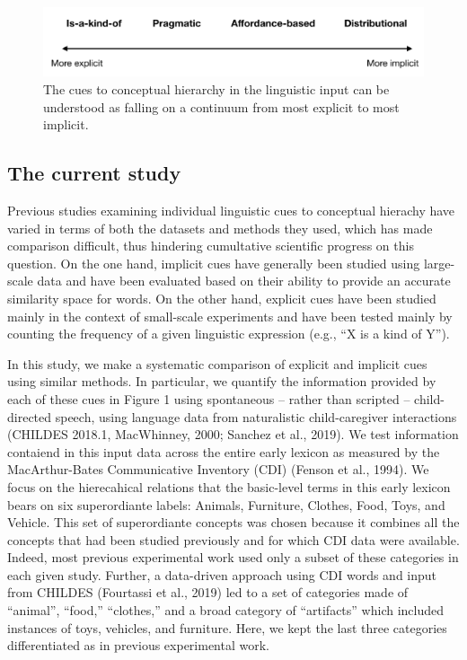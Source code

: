 \documentclass[english,,man]{apa6}
\begin{document}
\begin{figure}[h]

{\centering \includegraphics{child_language_journal_files/figure-latex/cues-1} 

}

\caption{\label{fig:cues} The cues to conceptual hierarchy in the linguistic input can be understood as falling on a continuum from most explicit to most implicit.}\label{fig:cues}
\end{figure}

\hypertarget{the-current-study}{%
\subsection{The current study}\label{the-current-study}}

Previous studies examining individual linguistic cues to conceptual hierachy have varied in terms of both the datasets and methods they used, which has made comparison difficult, thus hindering cumultative scientific progress on this question. On the one hand, implicit cues have generally been studied using large-scale data and have been evaluated based on their ability to provide an accurate similarity space for words. On the other hand, explicit cues have been studied mainly in the context of small-scale experiments and have been tested mainly by counting the frequency of a given linguistic expression (e.g., \enquote{X is a kind of Y}).

In this study, we make a systematic comparison of explicit and implicit cues using similar methods. In particular, we quantify the information provided by each of these cues in Figure 1 using spontaneous -- rather than scripted -- child-directed speech, using language data from naturalistic child-caregiver interactions (CHILDES 2018.1, MacWhinney, 2000; Sanchez et al., 2019). We test information contaiend in this input data across the entire early lexicon as measured by the MacArthur-Bates Communicative Inventory (CDI) (Fenson et al., 1994). We focus on the hierecahical relations that the basic-level terms in this early lexicon bears on six superordiante labels: Animals, Furniture, Clothes, Food, Toys, and Vehicle. This set of superordiante concepts was chosen because it combines all the concepts that had been studied previously and for which CDI data were available. Indeed, most previous experimental work used only a subset of these categories in each given study. Further, a data-driven approach using CDI words and input from CHILDES (Fourtassi et al., 2019) led to a set of categories made of \enquote{animal}, \enquote{food,} \enquote{clothes,} and a broad category of \enquote{artifacts} which included instances of toys, vehicles, and furniture. Here, we kept the last three categories differentiated as in previous experimental work.
\end{document}
